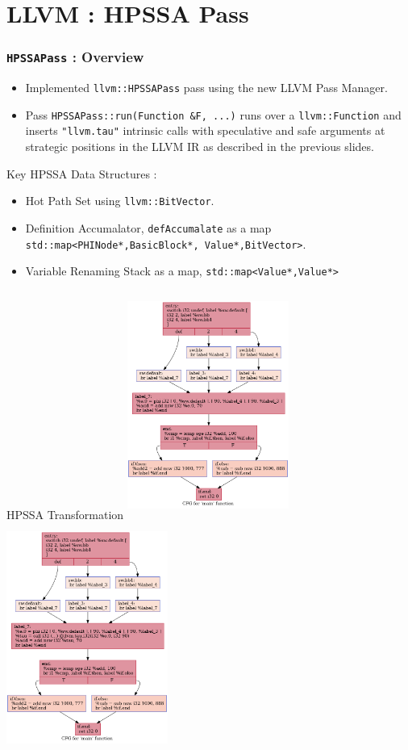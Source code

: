 \documentclass{beamer}
\begin{document}
\section{LLVM : HPSSA Pass}
\footnotesize
\begin{frame}
	\frametitle{\texttt{HPSSAPass} : Overview}
	\begin{itemize}
		\item Implemented \texttt{llvm::HPSSAPass} pass using the new LLVM Pass Manager. 
		\item Pass \texttt{HPSSAPass::run(Function \&F, ...)}  runs over a \texttt{llvm::Function} and inserts \texttt{"llvm.tau"} intrinsic calls with speculative and safe arguments at strategic positions in the LLVM IR as described in the previous slides.
	\end{itemize}
	Key HPSSA Data Structures :  
	\begin{itemize}
		\item Hot Path Set using \texttt{llvm::BitVector}.
		\item Definition Accumalator, \texttt{defAccumalate} as a map  \texttt{std::map<{PHINode*,BasicBlock*}, {Value*,BitVector}>}.
		\item Variable Renaming Stack as a map, \texttt{std::map<Value*,Value*>}
	\end{itemize}
\end{frame}

\begin{frame}{HPSSA Transformation}
	\includegraphics[width=5.3cm,height=7.5cm]{baseline.dot.png}
	\includegraphics[width=5.3cm,height=7.5cm]{afterHPSSA.dot.png}
\end{frame}
\end{document}
